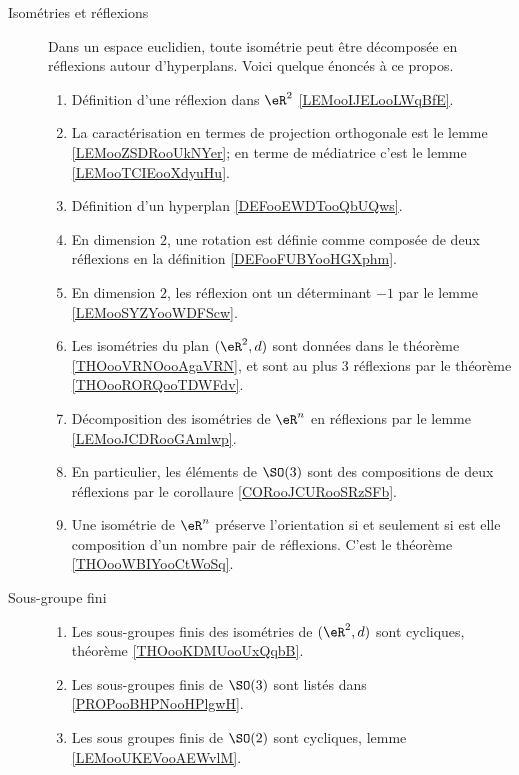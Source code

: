 \begin{description}
    \item[Isométries et réflexions]
        Dans un espace euclidien, toute isométrie peut être décomposée en réflexions autour d'hyperplans. Voici quelque énoncés à ce propos.
\begin{enumerate}
    \item
        Définition d'une réflexion dans \( \eR^2\) \ref{LEMooIJELooLWqBfE}.
    \item
        La caractérisation en termes de projection orthogonale est le lemme \ref{LEMooZSDRooUkNYer}; en terme de médiatrice c'est le lemme \ref{LEMooTCIEooXdyuHu}.
    \item
        Définition d'un hyperplan \ref{DEFooEWDTooQbUQws}.
    \item
        En dimension \( 2\), une rotation est définie comme composée de deux réflexions en la définition \ref{DEFooFUBYooHGXphm}.
    \item
        En dimension \( 2\), les réflexion ont un déterminant \( -1\) par le lemme \ref{LEMooSYZYooWDFScw}.
    \item
        Les isométries du plan \( (\eR^2,d)\) sont données dans le théorème \ref{THOooVRNOooAgaVRN}, et sont au plus 3 réflexions par le théorème \ref{THOooRORQooTDWFdv}.
    \item
        Décomposition des isométries de \( \eR^n\) en réflexions par le lemme \ref{LEMooJCDRooGAmlwp}.
    \item
        En particulier, les éléments de \( \SO(3)\) sont des compositions de deux réflexions par le corollaure \ref{CORooJCURooSRzSFb}.
    \item
        Une isométrie de \( \eR^n\) préserve l'orientation si et seulement si est elle composition d'un nombre pair de réflexions. C'est le théorème \ref{THOooWBIYooCtWoSq}.
\end{enumerate}
\item[Sous-groupe fini]
    \begin{enumerate}
        \item
            Les sous-groupes finis des isométries de \( (\eR^2,d)\) sont cycliques, théorème \ref{THOooKDMUooUxQqbB}.
        \item
            Les sous-groupes finis de \( \SO(3)\) sont listés dans \ref{PROPooBHPNooHPlgwH}.
        \item
            Les sous groupes finis de \( \SO(2)\) sont cycliques, lemme \ref{LEMooUKEVooAEWvlM}.
    \end{enumerate}
\end{description}
